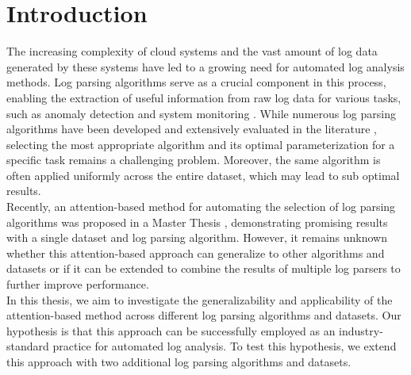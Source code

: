 

\chapter{Introduction}
\label{ch:Introduction}
The increasing complexity of cloud systems and the vast amount of log data generated by these systems have led to a growing need for automated log analysis methods. Log parsing algorithms serve as a crucial component in this process, enabling the extraction of useful information from raw log data for various tasks, such as anomaly detection\cite{nedelkoski2020selfsupervised, bogatinovski2021multisource} and system monitoring \cite{10.1007/978-3-030-44769-4_13}. While numerous log parsing algorithms have been developed and extensively evaluated in the literature \cite{zhu2019tools}, selecting the most appropriate algorithm and its optimal parameterization for a specific task remains a challenging problem. Moreover, the same algorithm is often applied uniformly across the entire dataset, which may lead to sub optimal results. \\

Recently, an attention-based method for automating the selection of log parsing algorithms was proposed in a Master Thesis \cite{witterauf2021domainml}, demonstrating promising results with a single dataset and log parsing algorithm. However, it remains unknown whether this attention-based approach can generalize to other algorithms and datasets or if it can be extended to combine the results of multiple log parsers to further improve performance.\\

In this thesis, we aim to investigate the generalizability and applicability of the attention-based method across different log parsing algorithms and datasets. Our hypothesis is that this approach can be successfully employed as an industry-standard practice for automated log analysis. To test this hypothesis, we extend this approach with two additional log parsing algorithms and datasets.\\

